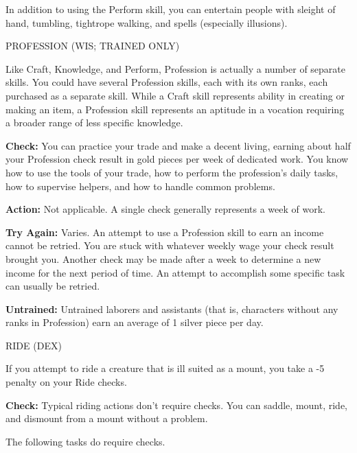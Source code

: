 \documentclass{article}
\begin{document}
In addition to using the Perform skill, you can entertain people with sleight of 
hand, tumbling, tightrope walking, and spells (especially illusions).

\vspace{12pt}
PROFESSION (WIS; TRAINED ONLY)

Like Craft, Knowledge, and Perform, Profession is actually a number of separate 
skills. You could have several Profession skills, each with its own ranks, each 
purchased as a separate skill. While a Craft skill represents ability in creating 
or making an item, a Profession skill represents an aptitude in a vocation requiring 
a broader range of less specific knowledge. 

\textbf{Check:} You can practice your trade and make a decent living, earning about 
half your Profession check result in gold pieces per week of dedicated work. You 
know how to use the tools of your trade, how to perform the profession's daily 
tasks, how to supervise helpers, and how to handle common problems.

\textbf{Action:} Not applicable. A single check generally represents a week of 
work.

\textbf{Try Again:} Varies. An attempt to use a Profession skill to earn an income 
cannot be retried. You are stuck with whatever weekly wage your check result brought 
you. Another check may be made after a week to determine a new income for the next 
period of time. An attempt to accomplish some specific task can usually be retried.

\textbf{Untrained:} Untrained laborers and assistants (that is, characters without 
any ranks in Profession) earn an average of 1 silver piece per day.

\vspace{12pt}
RIDE (DEX)

If you attempt to ride a creature that is ill suited as a mount, you take a -5 
penalty on your Ride checks.

\textbf{Check:} Typical riding actions don't require checks. You can saddle, mount, 
ride, and dismount from a mount without a problem.

The following tasks do require checks.
\end{document}
